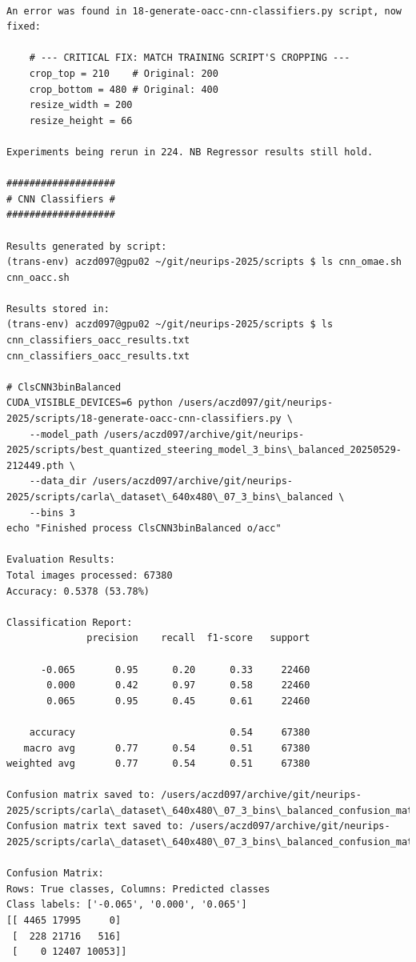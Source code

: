 \begin{verbatim}

An error was found in 18-generate-oacc-cnn-classifiers.py script, now fixed:

    # --- CRITICAL FIX: MATCH TRAINING SCRIPT'S CROPPING ---
    crop_top = 210    # Original: 200
    crop_bottom = 480 # Original: 400
    resize_width = 200
    resize_height = 66

Experiments being rerun in 224. NB Regressor results still hold.

###################
# CNN Classifiers #
###################

Results generated by script:
(trans-env) aczd097@gpu02 ~/git/neurips-2025/scripts $ ls cnn_omae.sh
cnn_oacc.sh

Results stored in:
(trans-env) aczd097@gpu02 ~/git/neurips-2025/scripts $ ls cnn_classifiers_oacc_results.txt
cnn_classifiers_oacc_results.txt

# ClsCNN3binBalanced
CUDA_VISIBLE_DEVICES=6 python /users/aczd097/git/neurips-2025/scripts/18-generate-oacc-cnn-classifiers.py \
    --model_path /users/aczd097/archive/git/neurips-2025/scripts/best_quantized_steering_model_3_bins\_balanced_20250529-212449.pth \
    --data_dir /users/aczd097/archive/git/neurips-2025/scripts/carla\_dataset\_640x480\_07_3_bins\_balanced \
    --bins 3
echo "Finished process ClsCNN3binBalanced o/acc"

Evaluation Results:
Total images processed: 67380
Accuracy: 0.5378 (53.78%)

Classification Report:
              precision    recall  f1-score   support

      -0.065       0.95      0.20      0.33     22460
       0.000       0.42      0.97      0.58     22460
       0.065       0.95      0.45      0.61     22460

    accuracy                           0.54     67380
   macro avg       0.77      0.54      0.51     67380
weighted avg       0.77      0.54      0.51     67380

Confusion matrix saved to: /users/aczd097/archive/git/neurips-2025/scripts/carla\_dataset\_640x480\_07_3_bins\_balanced_confusion_matrix.png
Confusion matrix text saved to: /users/aczd097/archive/git/neurips-2025/scripts/carla\_dataset\_640x480\_07_3_bins\_balanced_confusion_matrix.txt

Confusion Matrix:
Rows: True classes, Columns: Predicted classes
Class labels: ['-0.065', '0.000', '0.065']
[[ 4465 17995     0]
 [  228 21716   516]
 [    0 12407 10053]]
 

\end{verbatim}
